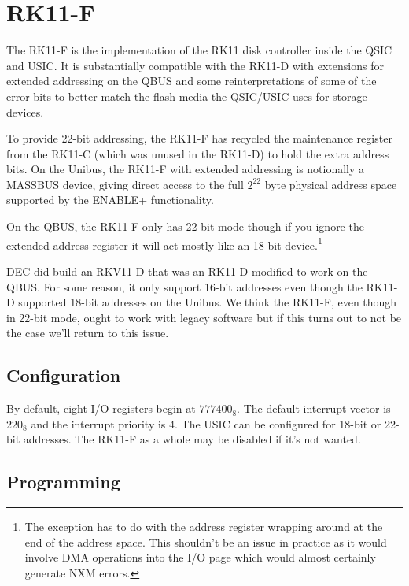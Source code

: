 %

\chapter{RK11-F}

The RK11-F is the implementation of the RK11 disk controller inside
the QSIC and USIC.  It is substantially compatible with the RK11-D
with extensions for extended addressing on the QBUS and some
reinterpretations of some of the error bits to better match the flash
media the QSIC/USIC uses for storage devices.

To provide 22-bit addressing, the RK11-F has recycled the maintenance
register from the RK11-C (which was unused in the RK11-D) to hold the
extra address bits.  On the Unibus, the RK11-F with extended
addressing is notionally a MASSBUS device, giving direct access to the
full $2^{22}$ byte physical address space supported by the ENABLE+
functionality.

On the QBUS, the RK11-F only has 22-bit mode though if you ignore the
extended address register it will act mostly like an 18-bit
device.\footnote{The exception has to do with the address register
  wrapping around at the end of the address space.  This shouldn't be
  an issue in practice as it would involve DMA operations into the I/O
  page which would almost certainly generate NXM errors.}

DEC did build an RKV11-D that was an RK11-D modified to work on the
QBUS.  For some reason, it only support 16-bit addresses even though
the RK11-D supported 18-bit addresses on the Unibus.  We think the
RK11-F, even though in 22-bit mode, ought to work with legacy software
but if this turns out to not be the case we'll return to this issue.


\section{Configuration}

By default, eight I/O registers begin at $777400_8$.  The default
interrupt vector is $220_8$ and the interrupt priority is 4.  The USIC
can be configured for 18-bit or 22-bit addresses.  The RK11-F as a
whole may be disabled if it's not wanted.

\section{Programming}

